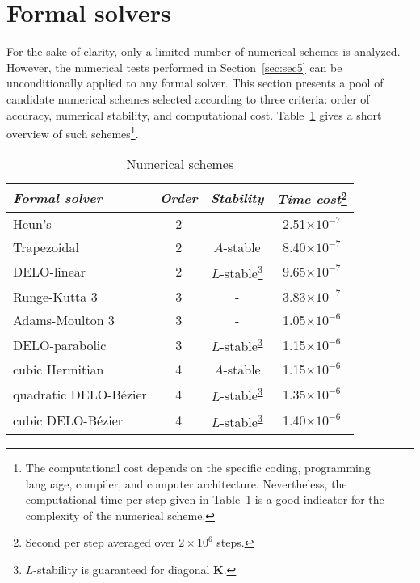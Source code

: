 \documentclass[iop,numberedappendix,twocolappendix,twocolumn]{emulateapj}
\begin{document}
\section{Formal solvers}\label{sec:sec3}
For the sake of clarity, only a limited number of numerical schemes is analyzed.
However, the numerical tests performed in Section~\ref{sec:sec5} can be unconditionally applied to any formal solver.
This section presents a pool of candidate numerical schemes selected according to three criteria: order of accuracy, numerical stability, and computational cost.
Table~\ref{tab:convergence} gives a short overview of such schemes\footnote{
The computational cost depends on the specific coding, programming language, compiler, and computer architecture. Nevertheless, the computational time per step given in Table~\ref{tab:convergence} is a good indicator for the complexity of the numerical scheme.}. 
%
\begin{table}
\caption{Numerical schemes}
\setlength{\tabcolsep}{5pt}\renewcommand{\arraystretch}{1.5}
\centering
\begin{tabular}{|l|c|c|c|}\hline%
\emph{Formal solver}	& \emph{Order}	& \emph{Stability}	& \emph{Time cost}\footnote{Second per step averaged over $2\times 10^{6}$ steps.}\\
\hline %
Heun's 			& 2 	& -		&2.51$\times 10^{-7}$\\
Trapezoidal 		& 2 	& $A$-stable	&8.40$\times 10^{-7}$\\
DELO-linear		& 2 	& $L$-stable\footnote{\label{note1}$L$-stability is guaranteed for diagonal $\mathbf K$.}	&9.65$\times 10^{-7}$\\
Runge-Kutta 3		& 3 	& - 		&3.83$\times 10^{-7}$\\
Adams-Moulton 3		& 3 	& - 		&1.05$\times 10^{-6}$\\
DELO-parabolic		& 3 	& $L$-stable\textsuperscript{\ref{note1}} 	&1.15$\times 10^{-6}$\\
cubic Hermitian		& 4 	& $A$-stable 	&1.15$\times 10^{-6}$\\
quadratic DELO-B\'ezier	& 4 	& $L$-stable\textsuperscript{\ref{note1}}	&1.35$\times 10^{-6}$\\
cubic DELO-B\'ezier	& 4 	& $L$-stable\textsuperscript{\ref{note1}}	&1.40$\times 10^{-6}$\\\hline 
\end{tabular}
\vspace*{0.3cm}
\label{tab:convergence}
\end{table}%
%
\end{document}
